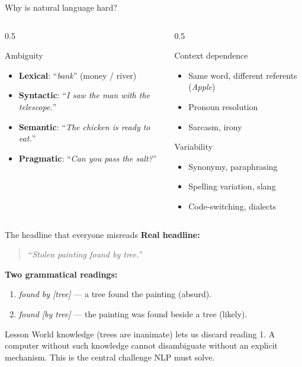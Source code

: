 \documentclass[11pt,aspectratio=169]{beamer}
\begin{document}
\begin{frame}{Why is natural language hard?}
\begin{columns}[T]
\begin{column}{0.5\textwidth}
\begin{alertblock}{Ambiguity}
\begin{itemize}
    \item \textbf{Lexical}: ``\emph{bank}'' (money / river)
    \item \textbf{Syntactic}: ``\emph{I saw the man with the telescope.}''
    \item \textbf{Semantic}: ``\emph{The chicken is ready to eat.}''
    \item \textbf{Pragmatic}: ``\emph{Can you pass the salt?}''
\end{itemize}
\end{alertblock}
\end{column}
\begin{column}{0.5\textwidth}
\begin{alertblock}{Context dependence}
\begin{itemize}
    \item Same word, different referents (\emph{Apple})
    \item Pronoun resolution
    \item Sarcasm, irony
\end{itemize}
\end{alertblock}
\begin{alertblock}{Variability}
\begin{itemize}
    \item Synonymy, paraphrasing
    \item Spelling variation, slang
    \item Code-switching, dialects
\end{itemize}
\end{alertblock}
\end{column}
\end{columns}
\end{frame}

\begin{frame}{The headline that everyone misreads}
\textbf{Real headline:}
\begin{quote}
``\emph{Stolen painting found by tree.}''
\end{quote}
\vfill
\textbf{Two grammatical readings:}
\begin{enumerate}
    \item \emph{found by [tree]} --- a tree found the painting (absurd).
    \item \emph{found [by tree]} --- the painting was found beside a tree (likely).
\end{enumerate}
\vfill
\begin{exampleblock}{Lesson}
World knowledge (trees are inanimate) lets us discard reading 1. A computer without such knowledge cannot disambiguate without an explicit mechanism. This is the central challenge NLP must solve.
\end{exampleblock}
\end{frame}
\end{document}
